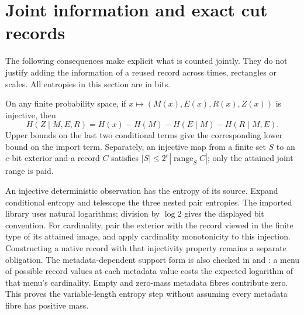 \section{Joint information and exact cut records}\label{sec:accounting}

The following consequences make explicit what is counted jointly. They
do not justify adding the information of a reused record across times,
rectangles or scales. All entropies in this section are in bits.

\begin{lemma}\label{lem:joint-invoices}
On any finite probability space, if $x\mapsto(M(x),E(x),R(x),Z(x))$
is injective, then
\[
 H(Z\mid M,E,R)=H(x)-H(M)-H(E\mid M)-H(R\mid M,E).
\]
Upper bounds on the last two conditional terms give the corresponding
lower bound on the import term. Separately, an injective map from a finite
set $S$ to an $e$-bit exterior and a record $C$ satisfies
$|S|\le2^e|\operatorname{range}_S C|$; only the attained joint range is
paid.
\end{lemma}
\begin{outline}
An injective deterministic observation has the entropy of its source.
Expand conditional entropy and telescope the three nested pair entropies.
The imported library uses natural logarithms; division by $\log 2$ gives
the displayed bit convention. For cardinality, pair the exterior with
the record viewed in the finite type of its attained image, and apply
cardinality monotonicity to this injection. Constructing a native record
with that injectivity property remains a separate obligation.
The metadata-dependent support form is also checked in
 and
: a menu of possible record
values at each metadata value costs the expected logarithm of that menu's
cardinality. Empty and zero-mass metadata fibres contribute zero. This
proves the variable-length entropy step without assuming every metadata
fibre has positive mass.
\end{outline}

